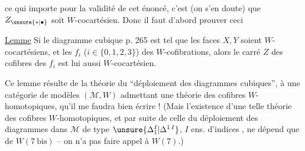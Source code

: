 
ce qui importe pour la validité de cet énoncé, c'est (on s'en doute) que $Z_{\unsure{*|\bullet}}$ soit $W$-cocartésien. Donc il faut d'abord prouver ceci

\uline{Lemme} Si le diagramme cubique p. 265 est tel que les faces $X,Y$ soient $W$-cocartésiens, et  les $f_i$ ($i\in\{0,1,2,3\}$) des $W$-cofibrations, alors le carré $Z$  des cofibres des $f_i$ est lui aussi $W$-cocartésien.

Ce lemme résulte de la théorie du ``déploiement des diagrammes cubiques'',   à une catégorie de modèles $(\mathcal M,W)$ admettant une théorie des cofibres $W$-homotopiques, qu'il me faudra bien écrire ! (Mais l'existence  d'une telle théorie des cofibres $W$-homotopiques, et par suite de celle du déploiement des diagrammes dans $\mathcal M$ de type $\unsure{\Delta_1^{I}|\Delta^{1\,I}}$, $I$ ens. d'indices , ne dépend que de $W(7\ \mathrm{bis})$ -- on n'a pas  faire appel à $W(7)$.)
